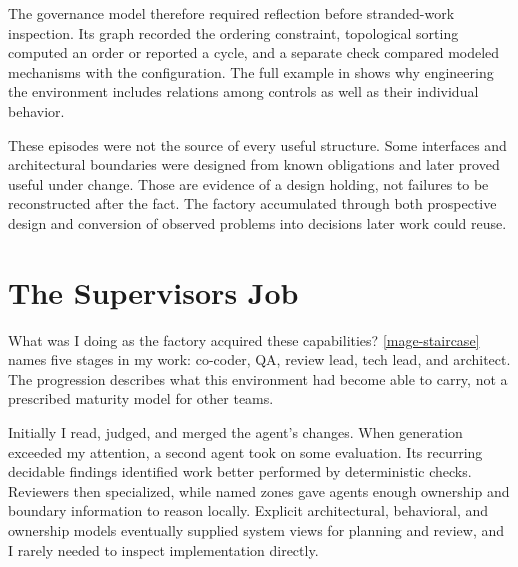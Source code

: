 The governance model therefore required reflection before stranded-work inspection. Its graph recorded the ordering constraint, topological sorting computed an order or reported a cycle, and a separate check compared modeled mechanisms with the configuration. The full example in  shows why engineering the environment includes relations among controls as well as their individual behavior.


These episodes were not the source of every useful structure. Some interfaces and architectural boundaries were designed from known obligations and later proved useful under change. Those are evidence of a design holding, not failures to be reconstructed after the fact. The factory accumulated through both prospective design and conversion of observed problems into decisions later work could reuse.

\section{The Supervisor\textquotesingle s Job}\label{heading:the-supervisors-job}



What was I doing as the factory acquired these capabilities? \autoref{mage-staircase} names five stages in my work: co-coder, QA, review lead, tech lead, and architect. The progression describes what this environment had become able to carry, not a prescribed maturity model for other teams.


Initially I read, judged, and merged the agent's changes. When generation exceeded my attention, a second agent took on some evaluation. Its recurring decidable findings identified work better performed by deterministic checks. Reviewers then specialized, while named zones gave agents enough ownership and boundary information to reason locally. Explicit architectural, behavioral, and ownership models eventually supplied system views for planning and review, and I rarely needed to inspect implementation directly.

